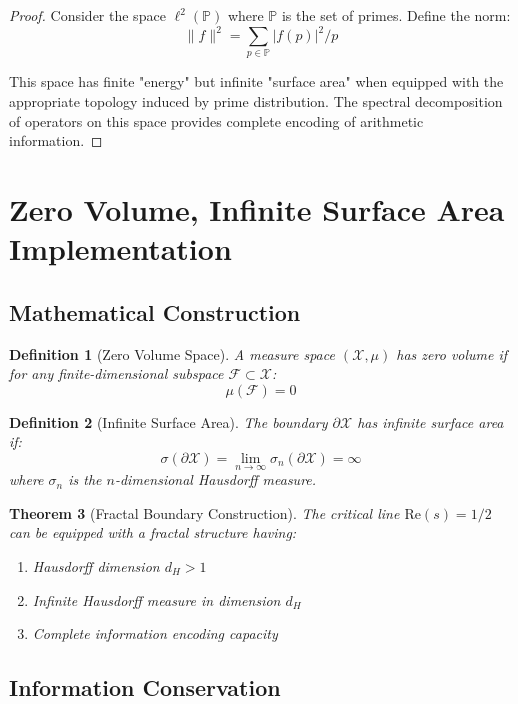 \documentclass[12pt]{article}
\newtheorem{theorem}{Theorem}[section]
\newtheorem{definition}[theorem]{Definition}
\begin{document}
\begin{proof}
Consider the space $\ell^2(\mathbb{P})$ where $\mathbb{P}$ is the set of primes. Define the norm:
$$\|f\|^2 = \sum_{p \in \mathbb{P}} |f(p)|^2 / p$$

This space has finite "energy" but infinite "surface area" when equipped with the appropriate topology induced by prime distribution. The spectral decomposition of operators on this space provides complete encoding of arithmetic information.
\end{proof}

\section{Zero Volume, Infinite Surface Area Implementation}

\subsection{Mathematical Construction}

\begin{definition}[Zero Volume Space]
A measure space $(\mathcal{X}, \mu)$ has zero volume if for any finite-dimensional subspace $\mathcal{F} \subset \mathcal{X}$:
$$\mu(\mathcal{F}) = 0$$
\end{definition}

\begin{definition}[Infinite Surface Area]
The boundary $\partial\mathcal{X}$ has infinite surface area if:
$$\sigma(\partial\mathcal{X}) = \lim_{n \to \infty} \sigma_n(\partial\mathcal{X}) = \infty$$
where $\sigma_n$ is the $n$-dimensional Hausdorff measure.
\end{definition}

\begin{theorem}[Fractal Boundary Construction]
The critical line $\text{Re}(s) = 1/2$ can be equipped with a fractal structure having:
\begin{enumerate}
\item Hausdorff dimension $d_H > 1$
\item Infinite Hausdorff measure in dimension $d_H$
\item Complete information encoding capacity
\end{enumerate}
\end{theorem}

\subsection{Information Conservation}
\end{document}
